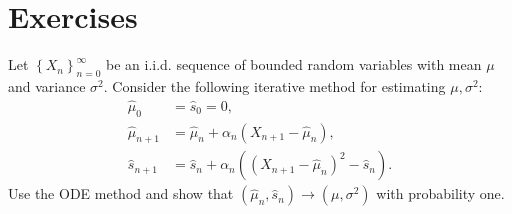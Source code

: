 \section{Exercises}

\begin{exercise}
Let $\left\{ {{X_n}} \right\}_{n = 0}^\infty $ be an i.i.d. sequence of bounded random variables with mean $\mu $ and variance ${\sigma ^2}$. Consider the following iterative method for estimating $\mu ,{\sigma ^2}$:
\begin{equation*}
    \begin{split}
       {\hat \mu _0} &= {\hat s_0} = 0 ,\\
        {\hat \mu _{n + 1}} &= {\hat \mu _n} + {\alpha _n}\left( {{X_{n + 1}} - {{\hat \mu }_n}} \right) ,\\
        {\hat s_{n + 1}} &= {\hat s_n} + {\alpha _n}\left( {{{\left( {{X_{n + 1}} - {{\hat \mu }_n}} \right)}^2} - {{\hat s}_n}} \right).
     \end{split}
\end{equation*}
Use the ODE method and show that $\left( {{{\hat \mu }_n},{{\hat s}_n}} \right) \to \left( {\mu ,{\sigma ^2}} \right)$ with probability one.
\end{exercise}

